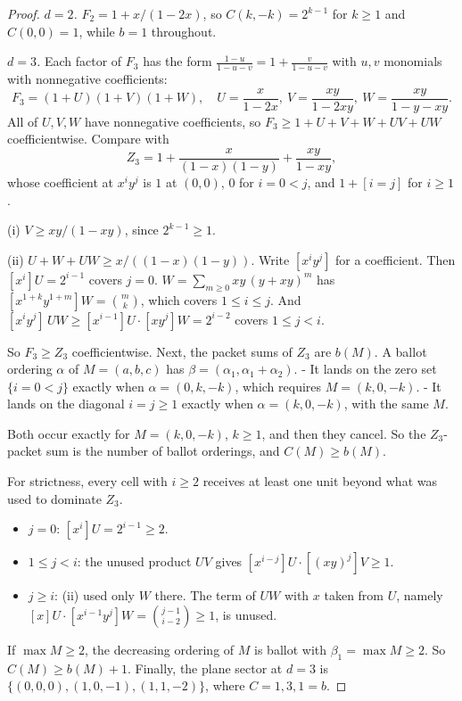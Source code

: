 \documentclass[11pt,a4paper]{article}
\theoremstyle{plain}
\theoremstyle{definition}
\theoremstyle{remark}
\begin{document}
\begin{proof}
\emph{$d = 2$.} $F_2 = 1 + x/(1-2x)$, so $C(k,-k) = 2^{k-1}$ for $k \ge 1$ and $C(0,0) = 1$, while
$b = 1$ throughout.

\emph{$d = 3$.} Each factor of $F_3$ has the form $\frac{1-u}{1-u-v} = 1 + \frac{v}{1-u-v}$ with $u, v$
monomials with nonnegative coefficients:
\[
  F_3 = (1 + U)(1 + V)(1 + W), \quad U = \frac{x}{1-2x},\ V = \frac{xy}{1-2xy},\ W = \frac{xy}{1-y-xy}.
\]
All of $U, V, W$ have nonnegative coefficients, so $F_3 \ge 1 + U + V + W + UV + UW$ coefficientwise.
Compare with
\[
  Z_3 = 1 + \frac{x}{(1-x)(1-y)} + \frac{xy}{1-xy},
\]
whose coefficient at $x^i y^j$ is $1$ at $(0,0)$, $0$ for $i = 0 < j$, and $1 + [i = j]$ for $i \ge 1$.

(i) $V \ge xy/(1-xy)$, since $2^{k-1} \ge 1$.

(ii) $U + W + UW \ge x/((1-x)(1-y))$. Write $[x^iy^j]$ for a coefficient. Then $[x^i]U = 2^{i-1}$
covers $j = 0$. $W = \sum_{m \ge 0} xy\,(y + xy)^m$ has $[x^{1+k}y^{1+m}]W = \binom mk$, which covers
$1 \le i \le j$. And $[x^i y^j]\,UW \ge [x^{i-1}]U \cdot [x y^{j}]W = 2^{i-2}$ covers $1 \le j < i$.

So $F_3 \ge Z_3$ coefficientwise. Next, the packet sums of $Z_3$ are $b(M)$. A ballot ordering $\alpha$
of $M = (a,b,c)$ has $\beta = (\alpha_1, \alpha_1 + \alpha_2)$.
- It lands on the zero set $\{i = 0 < j\}$ exactly when $\alpha = (0, k, -k)$, which requires
  $M = (k, 0, -k)$.
- It lands on the diagonal $i = j \ge 1$ exactly when $\alpha = (k, 0, -k)$, with the same $M$.

Both occur exactly for $M = (k, 0, -k)$, $k \ge 1$, and then they cancel. So the $Z_3$-packet sum is
the number of ballot orderings, and $C(M) \ge b(M)$.

For strictness, every cell with $i \ge 2$ receives at least one unit beyond what was used to
dominate $Z_3$.
\begin{itemize}[nosep]
\item $j = 0$: $[x^i]U = 2^{i-1} \ge 2$.
\item $1 \le j < i$: the unused product $UV$ gives $[x^{i-j}]U \cdot [(xy)^j]V \ge 1$.
\item $j \ge i$: (ii) used only $W$ there. The term of $UW$ with $x$ taken from $U$, namely
  $[x]U \cdot [x^{i-1}y^j]W = \binom{j-1}{i-2} \ge 1$, is unused.
\end{itemize}

If $\max M \ge 2$, the decreasing ordering of $M$ is ballot with $\beta_1 = \max M \ge 2$. So
$C(M) \ge b(M) + 1$. Finally, the plane sector at $d = 3$ is $\{(0,0,0), (1,0,-1), (1,1,-2)\}$, where
$C = 1, 3, 1 = b$.
\end{proof}
\end{document}
